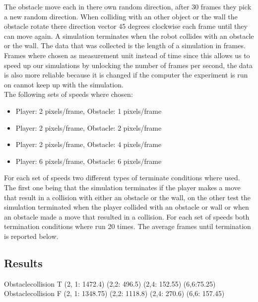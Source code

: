 \documentclass[conference]{IEEEtran}
\begin{document}
\noindent
The obstacle move each in there own random direction, after 30 frames they pick a new random direction. When colliding with an other object or the wall the obstacle rotate there direction vector 45 degrees clockwise each frame until they can move again. A simulation terminates when the robot collides with an obstacle or the wall. The data that was collected is the length of a simulation in frames.
Frames where chosen as measurement unit instead of time since this allows us to speed up our simulations by unlocking the number of frames per second, the data is also more reliable because it is changed if the computer the experiment is run on cannot keep up with the simulation.\\

The following sets of speeds where chosen:
\begin{itemize}
  \item Player: 2 pixels/frame, Obstacle: 1 pixels/frame
  \item Player: 2 pixels/frame, Obstacle: 2 pixels/frame
  \item Player: 2 pixels/frame, Obstacle: 4 pixels/frame
  \item Player: 6 pixels/frame, Obstacle: 6 pixels/frame
\end{itemize}

\noindent
For each set of speeds two different types of terminate conditions where used. The first one being that the simulation terminates if the player makes a move that result in a collision with either an obstacle or the wall, on the other test the simulation terminated when the player collided with an obstacle or wall or when an obstacle made a move that resulted in a collision. For each set of speeds both termination conditions where run 20 times. The average frames until termination is reported below.

\subsection{Results}
Obstaclecollision T (2, 1: 1472.4) (2,2: 496.5) (2,4: 152.55) (6,6:75.25)\\
Obstaclecollision F (2, 1: 1348.75) (2,2: 1118.8) (2,4: 270.6) (6,6: 157.45)\\
\end{document}
